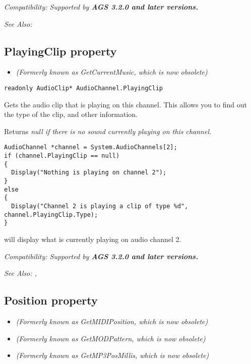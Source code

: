 \it{Compatibility:} Supported by \bf{AGS 3.2.0} and later versions.

\it{See Also:} 


\subsection{PlayingClip property}\label{AudioChannel.PlayingClip}%

\begin{itemize}
\item \it{(Formerly known as GetCurrentMusic, which is now obsolete)}
\end{itemize}

\begin{verbatim}
readonly AudioClip* AudioChannel.PlayingClip
\end{verbatim}
Gets the audio clip that is playing on this channel. This allows you to find out the type
of the clip, and other information.

Returns \it{null} if there is no sound currently playing on this channel.

\begin{verbatim}
AudioChannel *channel = System.AudioChannels[2];
if (channel.PlayingClip == null)
{
  Display("Nothing is playing on channel 2");
}
else
{
  Display("Channel 2 is playing a clip of type %d", channel.PlayingClip.Type);
}
\end{verbatim}
will display what is currently playing on audio channel 2.

\it{Compatibility:} Supported by \bf{AGS 3.2.0} and later versions.

\it{See Also:} , 


\subsection{Position property}\label{AudioChannel.Position}%

\begin{itemize}
\item \it{(Formerly known as GetMIDIPosition, which is now obsolete)}
\item \it{(Formerly known as GetMODPattern, which is now obsolete)}
\item \it{(Formerly known as GetMP3PosMillis, which is now obsolete)}
\end{itemize}

